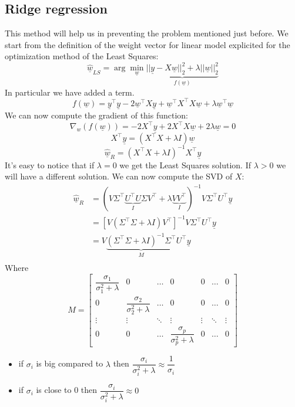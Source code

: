 \subsection*{Ridge regression }
This method will help us in preventing the problem mentioned just before. We start from the definition of the weight vector for linear model explicited for the optimization method of the Least Squares:
\[
    \underline{\hat{w}}_{LS} = \arg \min_{\underline{w}} \underbrace{||\underline{y} - X\underline{w}||_2^2 + \lambda ||\underline{w}||_2^2}_{f(\underline{w})}
\]
In particular we have added a term. 
\[
    f(\underline{w}) = \underline{y}^\intercal \underline{y} - 2\underline{w}^\intercal X \underline{y} + \underline{w}^\intercal X^\intercal X \underline{w} + \lambda \underline{w}^\intercal \underline{w}
\]
We can now compute the gradient of this function:
\[
        \nabla_w(f(\underline{w})) = -2X^\intercal \underline{y} + 2X^\intercal X \underline{w} + 2\lambda \underline{w} = 0      
\]
\[
    X^\intercal \underline{y} = (X^\intercal X + \lambda I)\underline{w}     
\]
\[
    \underline{\hat{w}}_{R} = (X^\intercal X + \lambda I)^{-1} X^\intercal \underline{y}    
\]
It's easy to notice that if $\lambda = 0$ we get the Least Squares solution. If $\lambda > 0$ we will have a different solution. We can now compute the SVD of $X$:
\[
    \begin{split}
        \underline{\hat{w}}_R &= (V\Sigma^\intercal \underbrace{U^\intercal U}_{I} \Sigma V^\intercal + \lambda \underbrace{V V^\intercal}_{I})^{-1} V\Sigma^\intercal U^\intercal \underline{y} \\
        &= \left[V(\Sigma^\intercal \Sigma + \lambda I)V^\intercal\right]^{-1} V\Sigma^\intercal U^\intercal \underline{y} \\
        &= V\underbrace{(\Sigma^\intercal \Sigma + \lambda I) ^{-1}\Sigma^\intercal}_{M}U^\intercal \underline{y} \\
    \end{split}    
\]
Where 
\[
M = \begin{bmatrix}
    \dfrac{\sigma_1}{\sigma_1^2 + \lambda} & 0 & \dots & 0 & 0 & \dots & 0\\
    0 & \dfrac{\sigma_2}{\sigma_2^2 + \lambda} & \dots & 0 & 0 & \dots & 0\\
    \vdots & \vdots & \ddots & \vdots & \vdots & \ddots & \vdots\\
    0 & 0 & \dots & \dfrac{\sigma_p}{\sigma_p^2 + \lambda} & 0 & \dots & 0
\end{bmatrix}
\]
\begin{itemize}
    \item if $\sigma_i$ is big compared to $\lambda$ then $\dfrac{\sigma_i}{\sigma_i^2 + \lambda} \approx \dfrac{1}{\sigma_i}$
    \item if $\sigma_i$ is close to 0 then $\dfrac{\sigma_i}{\sigma_i^2 + \lambda} \approx 0$
\end{itemize}
